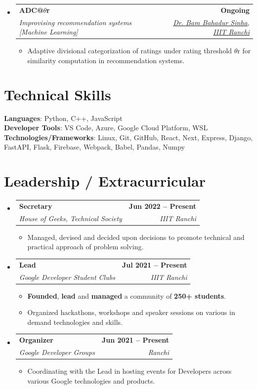 \documentclass[letterpaper,11pt]{article}
\makeatletter
\newcommand{\resumeItem}[1]{
  \item\small{
    {#1 \vspace{-2pt}}
  }
}
\newcommand{\resumeSubheading}[4]{
  \vspace{-2pt}\item
    \begin{tabular*}{1.0\textwidth}[t]{l@{\extracolsep{\fill}}r}
      \textbf{#1} & \textbf{\small #2} \\
      \textit{\small#3} & \textit{\small #4} \\
    \end{tabular*}\vspace{-7pt}
}
\newcommand{\resumeSubHeadingListStart}{\begin{itemize}[leftmargin=0.0in, label={}]}
\newcommand{\resumeSubHeadingListEnd}{\end{itemize}}
\newcommand{\resumeItemListStart}{\begin{itemize}}
\newcommand{\resumeItemListEnd}{\end{itemize}\vspace{-5pt}}
\makeatother
\begin{document}
    \resumeSubHeadingListStart

        \resumeSubheading{ADC@$\theta$r}{Ongoing}{Improvising recommendation systems [Machine Learning]}{\href{https://www.researchgate.net/profile/Bam-Sinha}{Dr. Bam Bahadur Sinha, IIIT Ranchi}}
            \resumeItemListStart
                \resumeItem{Adaptive divisional categorization of ratings under rating threshold $\theta$r for similarity computation in recommendation systems.}
            \resumeItemListEnd


    \resumeSubHeadingListEnd
\vspace{-15pt}
%
\section{Technical Skills}
 \begin{itemize}[leftmargin=0.15in, label={}]
    \small{\item{
     \textbf{Languages}{: Python, C++, JavaScript} \\
     \textbf{Developer Tools}{: VS Code, Azure, Google Cloud Platform, WSL} \\
     \textbf{Technologies/Frameworks}{: Linux, Git, GitHub, React, Next, Express, Django, FastAPI, Flask, Firebase, Webpack, Babel, Pandas, Numpy} \\
    }}
 \end{itemize}
 \vspace{-16pt}


\section{Leadership / Extracurricular}

    \resumeSubHeadingListStart
        \resumeSubheading{Secretary}{Jun 2022 -- Present}{House of Geeks, Technical Society}{IIIT Ranchi}
            \resumeItemListStart
                \resumeItem{Managed, devised and decided upon decisions to promote technical and practical approach of problem solving.}
            \resumeItemListEnd
            
        \resumeSubheading{Lead}{Jul 2021 -- Present}{Google Developer Student Clubs}{IIIT Ranchi}
            \resumeItemListStart
                \resumeItem{\textbf{Founded}, \textbf{lead} and \textbf{managed} a community of \textbf{250+ students}.}
                \resumeItem{Organized hackathons, workshops and speaker sessions on various in demand technologies and skills.}
            \resumeItemListEnd

        \resumeSubheading{Organizer}{Jun 2021 -- Present}{Google Developer Groups}{Ranchi}
            \resumeItemListStart
                \resumeItem{Coordinating with the Lead in hosting events for Developers across various Google technologies and products.}
            \resumeItemListEnd

    \resumeSubHeadingListEnd
\end{document}
